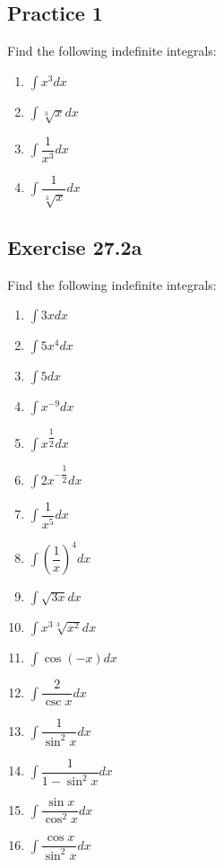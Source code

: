 \documentclass{report}
\begin{document}
\subsection{Practice 1}
Find the following indefinite integrals:
\begin{enumerate}
    \item $\displaystyle\int x^{3}dx$
    \item $\displaystyle\int{\sqrt[3]{x}}dx$
    \item $\displaystyle\int{\dfrac{1}{x^{3}}}dx$
    \item $\displaystyle\int{\dfrac{1}{\sqrt[3]{x}}}dx$
\end{enumerate}

\subsection{Exercise 27.2a}
Find the following indefinite integrals:
\begin{enumerate}
    \item $\displaystyle\int3xdx$
    \item $\displaystyle\int5x^{4}dx$
    \item $\displaystyle\int5dx$
    \item $\displaystyle\int x^{-9}dx$
    \item $\displaystyle\int x^{\dfrac{1}{2}}dx$
    \item $\displaystyle\int{2x^{-{\dfrac{1}{2}}}dx}$
    \item $\displaystyle\int{\dfrac{1}{x^5}}dx$
    \item $\displaystyle\int{\left(\dfrac{1}{x}\right)}^{4}dx$
    \item $\displaystyle\int{\sqrt{3x}}dx$
    \item $\displaystyle\int{x^3\sqrt[3]{x^2}}dx$
    \item $\displaystyle\int{\cos(-x)}dx$
    \item $\displaystyle\int{\dfrac{2}{\csc x}}dx$
    \item $\displaystyle\int{\dfrac{1}{\sin^2x}}dx$
    \item $\displaystyle\int{\dfrac{1}{1 - \sin^2x}}dx$
    \item $\displaystyle\int{\dfrac{\sin x}{\cos^2x}}dx$
    \item $\displaystyle\int{\dfrac{\cos x}{\sin^2x}}dx$
\end{enumerate}

\newpage
\end{document}
